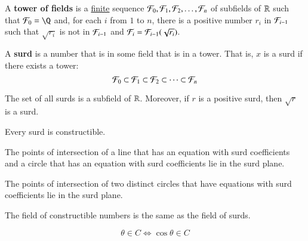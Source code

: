 \documentclass[11pt]{article}
\begin{document}
        \begin{definition}[12.2.16]
            A \textbf{tower of fields} is a \ul{finite} sequence $\mathcal{{F}}_0, \mathcal{{F}}_1, \mathcal{{F}}_2,\dots,\mathcal{{F}}_n$ of subfields of $\mathbb{R}$ such that $\mc{F}_0 = \Q$ and, for each $i$ from $1$ to $n$, there is a positive number $r_i$ in $\mathcal{{F}}_{i-1}$ such that $\sqrt{r_i}$ is not in $\mathcal{{F}}_{i-1}$ and $\mathcal{{F}}_i = \mathcal{{F}}_{i-1}(\sqrt{r_i})$.
        \end{definition}
        
        \begin{definition}[12.3.1]
            A \textbf{surd} is a number that is in some field that is in a tower. That is, $x$ is a surd if there exists a tower:
            \[
                \mathcal{{F}}_0 \subset \mathcal{{F}}_1 \subset \mathcal{{F}}_2 \subset \cdots \subset \mathcal{{F}}_n
            \]
        \end{definition}
        
        \begin{theorem}[12.3.2]
            The set of all surds is a subfield of $\mathbb{R}$. Moreover, if $r$ is a positive surd, then $\sqrt{r}$ is a surd.
        \end{theorem}
        
        \begin{theorem}[12.3.3]
            Every surd is constructible.
        \end{theorem}
        
        \begin{theorem}[12.3.10]
            The points of intersection of a line that has an equation with surd coefficients and a circle that has an equation with surd coefficients lie in the surd plane.
        \end{theorem}
        
        \begin{theorem}[12.3.11]
            The points of intersection of two distinct circles that have equations with surd coefficients lie in the surd plane.
        \end{theorem}
        
        \begin{theorem}[12.3.12]
            The field of constructible numbers is the same as the field of surds.
        \end{theorem}
        
        \begin{theorem}[12.3.13]
            \[
                \theta \in C \iff \cos \theta \in C
            \]
        \end{theorem}
        
\end{document}

